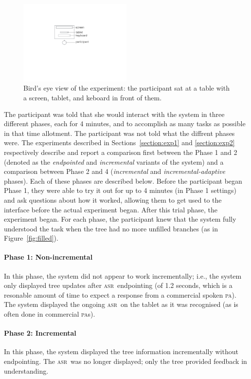 \documentclass[11pt]{article}
\newcommand{\asr}[0]{\textsc{asr}}
\newcommand{\pa}[0]{\textsc{pa}}
\begin{document}
\begin{figure}[ht]
  \centering
      \includegraphics[width=0.5\textwidth]{figures/dataview.pdf}	
      \caption{Bird's eye view of the experiment: the participant sat at a table with a screen, tablet, and keboard in front of them. \label{fig:dataview}}
\end{figure}

The participant was told that she would interact with the system in three different phases, each for 4 minutes, and to accomplish as many tasks as possible in that time allotment. The participant was not told what the diffrent phases were. The experiments described in Sections~\ref{section:exp1} and \ref{section:exp2} respectively describe and report a comparison first between the Phase 1 and 2 (denoted as the \emph{endpointed} and \emph{incremental} variants of the system) and a comparison between Phase 2 and 4 (\emph{incremental} and \emph{incremental-adaptive} phases). Each of these phases are described below. Before the participant began Phase 1, they were able to try it out for up to 4 minutes (in Phase 1 settings) and ask questions about how it worked, allowing them to get used to the interface before the actual experiment began. After this trial phase, the experiment began. For each phase, the participant knew that the system fully understood the task when the tree had no more unfilled branches (as in Figure~\ref{fig:filled}). 

\paragraph{Phase 1: Non-incremental} In this phase, the system did not appear to work incrementally; i.e., the system only displayed tree updates after \asr\ endpointing (of 1.2 seconds, which is a resonable amount of time to expect a response from a commercial spoken \pa). The system displayed the ongoing \asr\ on the tablet as it was recognised (as is often done in commercial \pa s). 

\paragraph{Phase 2: Incremental} In this phase, the system displayed the tree information incrementally without endpointing. The \asr\ was no longer displayed; only the tree provided feedback in understanding. 
\end{document}
